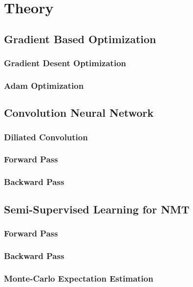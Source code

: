 \chapter{Theory}


\clearpage

\section{Gradient Based Optimization}
\subsection{Gradient Desent Optimization}
\subsection{Adam Optimization}
\clearpage

\section{Convolution Neural Network}
\subsection{Diliated Convolution}
\subsection{Forward Pass}
\subsection{Backward Pass}
\clearpage


\clearpage


\clearpage

\section{Semi-Supervised Learning for NMT}
\subsection{Forward Pass}
\subsection{Backward Pass}
\subsection{Monte-Carlo Expectation Estimation}
\clearpage